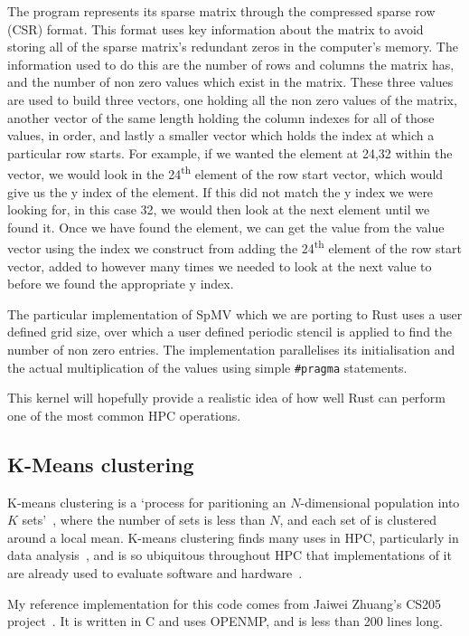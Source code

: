 The program represents its sparse matrix through the compressed sparse row (CSR) format. This format uses key information about the matrix to avoid storing all of the sparse matrix's redundant zeros in the computer's memory. The information used to do this are the number of rows and columns the matrix has, and the number of non zero values which exist in the matrix. These three values are used to build three vectors, one holding all the non zero values of the matrix, another vector of the same length holding the column indexes for all of those values, in order, and lastly a smaller vector which holds the index at which a particular row starts. For example, if we wanted the element at 24,32 within the vector, we would look in the 24\textsuperscript{th} element of the row start vector, which would give us the y index of the element. If this did not match the y index we were looking for, in this case 32, we would then look at the next element until we found it. Once we have found the element, we can get the value from the value vector using the index we construct from adding the 24\textsuperscript{th} element of the row start vector, added to however many times we needed to look at the next value to before we found the appropriate y index.

The particular implementation of SpMV which we are porting to Rust uses a user defined grid size, over which a user defined periodic stencil is applied to find the number of non zero entries. The implementation parallelises its initialisation and the actual multiplication of the values using simple \texttt{\#pragma} statements.

This kernel will hopefully provide a realistic idea of how well Rust can perform one of the most common HPC operations.

\subsection{K-Means clustering}

K-means clustering is a `process for paritioning an $N$-dimensional population into $K$ sets'~\cite{macqueen1967}, where the number of sets is less than $N$, and each set of is clustered around a local mean. K-means clustering finds many uses in HPC, particularly in data analysis~\cite{DBLP:journals/corr/ChakrabortyND14a, ordovas2014fast}, and is so ubiquitous throughout HPC that implementations of it are already used to evaluate software and hardware~\cite{Yang2014}.

My reference implementation for this code comes from Jaiwei Zhuang's CS205 project~\cite{CS205}. It is written in C and uses OPENMP, and is less than 200 lines long.

